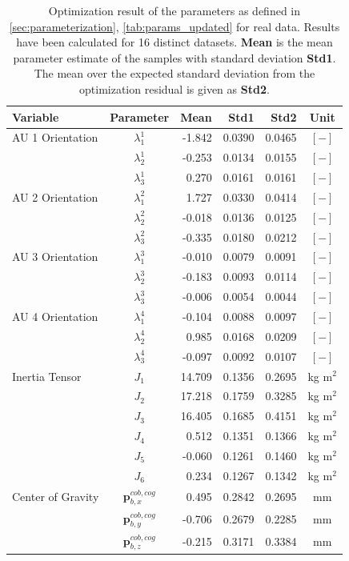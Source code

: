 \begin{table}[H]
\begin{tabular}{lcrrrc}
Variable & Parameter & Mean & Std1 & Std2 & Unit \\
\hline \hline
AU 1 Orientation & $\lambda_1^1$ & -1.842 & 0.0390 & 0.0465 & $[-]$ \\
                 & $\lambda_2^1$ & -0.253 & 0.0134 & 0.0155 & $[-]$ \\
                 & $\lambda_3^1$ &  0.270 & 0.0161 & 0.0161 & $[-]$ \\
AU 2 Orientation & $\lambda_1^2$ &  1.727 & 0.0330 & 0.0414 & $[-]$ \\
                 & $\lambda_2^2$ & -0.018 & 0.0136 & 0.0125 & $[-]$ \\
                 & $\lambda_3^2$ & -0.335 & 0.0180 & 0.0212 & $[-]$ \\
AU 3 Orientation & $\lambda_1^3$ & -0.010 & 0.0079 & 0.0091 & $[-]$ \\
                 & $\lambda_2^3$ & -0.183 & 0.0093 & 0.0114 & $[-]$ \\
                 & $\lambda_3^3$ & -0.006 & 0.0054 & 0.0044 & $[-]$ \\
AU 4 Orientation & $\lambda_1^4$ & -0.104 & 0.0088 & 0.0097 & $[-]$ \\
                 & $\lambda_2^4$ &  0.985 & 0.0168 & 0.0209 & $[-]$ \\
                 & $\lambda_3^4$ & -0.097 & 0.0092 & 0.0107 & $[-]$ \\
\hline
Inertia Tensor & $J_1$ & 14.709 & 0.1356 & 0.2695 & kg m$^2$ \\
               & $J_2$ & 17.218 & 0.1759 & 0.3285 & kg m$^2$ \\
               & $J_3$ & 16.405 & 0.1685 & 0.4151 & kg m$^2$ \\
               & $J_4$ &  0.512 & 0.1351 & 0.1366 & kg m$^2$ \\
               & $J_5$ & -0.060 & 0.1261 & 0.1460 & kg m$^2$ \\
               & $J_6$ &  0.234 & 0.1267 & 0.1342 & kg m$^2$ \\
\hline
Center of Gravity & $\mathbf{p}_{b,x}^{cob,cog}$ &  0.495 & 0.2842 & 0.2695 & mm \\
                  & $\mathbf{p}_{b,y}^{cob,cog}$ & -0.706 & 0.2679 & 0.2285 & mm \\
                  & $\mathbf{p}_{b,z}^{cob,cog}$ & -0.215 & 0.3171 & 0.3384 & mm \\
\hline
\end{tabular}
\caption{Optimization result of the parameters as defined in \cref{sec:parameterization}, \cref{tab:params_updated} for real data. Results have been calculated for 16 distinct datasets. \textbf{Mean} is the mean parameter estimate of the samples with standard deviation \textbf{Std1}. The mean over the expected standard deviation from the optimization residual is given as \textbf{Std2}. }
\end{table}
